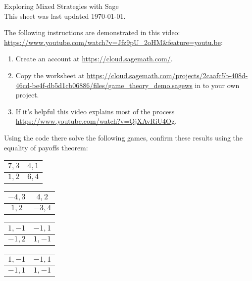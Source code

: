 \documentclass[12pt]{article}
\begin{document}
\begin{center}
\Huge{Exploring Mixed Strategies with Sage\\\tiny{This sheet was last updated \today.} }
\end{center}

The following instructions are demonstrated in this video: \url{https://www.youtube.com/watch?v=Jfz9pU_2oHM&feature=youtu.be}:

\begin{enumerate}
    \item Create an account at \url{https://cloud.sagemath.com/}.
    \item Copy the worksheet at
        \url{https://cloud.sagemath.com/projects/2caafc5b-408d-46cd-be4f-db5d1cb06886/files/game_theory_demo.sagews} in to your own project.
    \item If it's helpful this video explains most of the process
        \url{https://www.youtube.com/watch?v=QjXAvRiU4Og}.
\end{enumerate}

Using the code there solve the following games, confirm these results using the
equality of payoffs theorem:

\begin{center}
\begin{tabular}{|c|c|}
\hline
$7,3$&$4,1$\\\hline
$1,2$&$6,4$\\
\hline
\end{tabular}

\quad

\begin{tabular}{|c|c|}
\hline
$-4,3$&$4,2$\\\hline
$1,2$&$-3,4$\\
\hline
\end{tabular}
\end{center}

\begin{center}
\begin{tabular}{|c|c|}
\hline
$1,-1$&$-1,1$\\\hline
$-1,2$&$1,-1$\\
\hline
\end{tabular}

\quad

\begin{tabular}{|c|c|}
\hline
$1,-1$&$-1,1$\\\hline
$-1,1$&$1,-1$\\
\hline
\end{tabular}
\end{center}
\end{document}
